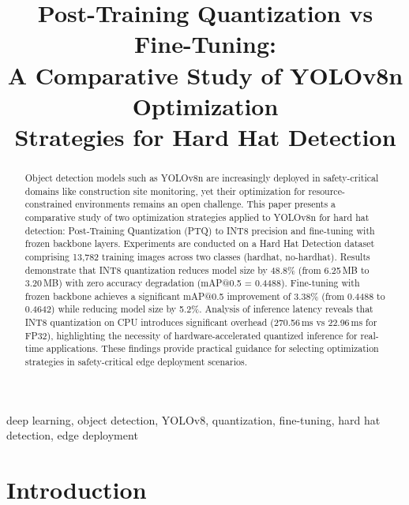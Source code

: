 \documentclass[conference,a4paper]{IEEEtran}
\begin{document}
\title{Post-Training Quantization vs Fine-Tuning:\\A Comparative Study of YOLOv8n Optimization\\Strategies for Hard Hat Detection}

\author{
}

\maketitle

\begin{abstract}
Object detection models such as YOLOv8n are increasingly deployed in safety-critical domains like construction site monitoring, yet their optimization for resource-constrained environments remains an open challenge. This paper presents a comparative study of two optimization strategies applied to YOLOv8n for hard hat detection: Post-Training Quantization (PTQ) to INT8 precision and fine-tuning with frozen backbone layers. Experiments are conducted on a Hard Hat Detection dataset comprising 13,782 training images across two classes (hardhat, no-hardhat). Results demonstrate that INT8 quantization reduces model size by 48.8\% (from 6.25\,MB to 3.20\,MB) with zero accuracy degradation (mAP@0.5 = 0.4488). Fine-tuning with frozen backbone achieves a significant mAP@0.5 improvement of 3.38\% (from 0.4488 to 0.4642) while reducing model size by 5.2\%. Analysis of inference latency reveals that INT8 quantization on CPU introduces significant overhead (270.56\,ms vs 22.96\,ms for FP32), highlighting the necessity of hardware-accelerated quantized inference for real-time applications. These findings provide practical guidance for selecting optimization strategies in safety-critical edge deployment scenarios.
\end{abstract}

\begin{IEEEkeywords}
deep learning, object detection, YOLOv8, quantization, fine-tuning, hard hat detection, edge deployment
\end{IEEEkeywords}

\section{Introduction}
\end{document}
